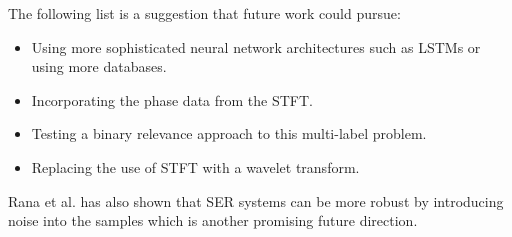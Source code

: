 \documentclass[a4paper, 10pt, conference]{ieeeconf}      %
\begin{document}
The following list is a suggestion that future work could pursue:
\begin{itemize}
	\item Using more sophisticated neural network architectures such as LSTMs or using more databases.
	\item Incorporating the phase data from the STFT.
	\item Testing a binary relevance approach to this multi-label problem.
	\item Replacing the use of STFT with a wavelet transform.
\end{itemize}
Rana et al. \cite{Rana2016} has also shown that SER systems can be more robust by introducing noise into the samples which is another promising future direction.
 





\end{document}
